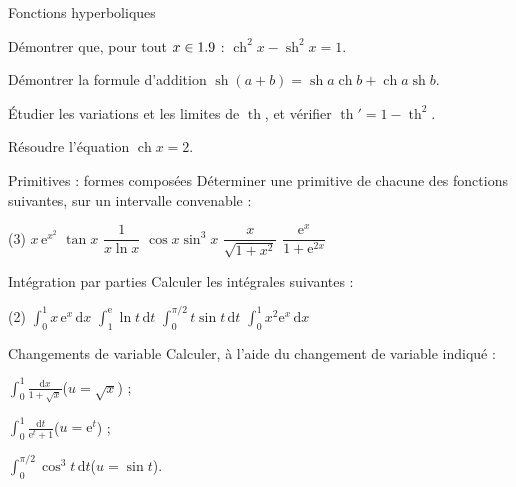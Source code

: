 \begin{exercice}[2]{Fonctions hyperboliques}
\begin{questions}
  \item Démontrer que, pour tout $x\in1.9$ :
    $\operatorname{ch}^{2}x-\operatorname{sh}^{2}x=1$.
  \item Démontrer la formule d'addition
    $\operatorname{sh}(a+b)=\operatorname{sh}a\operatorname{ch}b+\operatorname{ch}a\operatorname{sh}b$.
  \item Étudier les variations et les limites de $\operatorname{th}$, et
    vérifier $\operatorname{th}'=1-\operatorname{th}^{2}$.
  \item Résoudre l'équation $\operatorname{ch}x=2$.
\end{questions}
\end{exercice}

\begin{exercice}[2]{Primitives : formes composées}
Déterminer une primitive de chacune des fonctions suivantes, sur un
intervalle convenable :
\begin{tasks}(3)
  \task $x\,\mathrm{e}^{x^{2}}$
  \task $\tan x$
  \task $\dfrac{1}{x\ln x}$
  \task $\cos x\sin^{3}x$
  \task $\dfrac{x}{\sqrt{1+x^{2}}}$
  \task $\dfrac{\mathrm{e}^{x}}{1+\mathrm{e}^{2x}}$
\end{tasks}
\end{exercice}

\begin{exercice}[2]{Intégration par parties}
Calculer les intégrales suivantes :
\begin{tasks}(2)
  \task $\displaystyle\int_{0}^{1}x\,\mathrm{e}^{x}\,\mathrm{d}x$
  \task $\displaystyle\int_{1}^{\mathrm{e}}\ln t\,\mathrm{d}t$
  \task $\displaystyle\int_{0}^{\pi/2}t\sin t\,\mathrm{d}t$
  \task $\displaystyle\int_{0}^{1}x^{2}\mathrm{e}^{x}\,\mathrm{d}x$
\end{tasks}
\end{exercice}

\begin{exercice}[2]{Changements de variable}
Calculer, à l'aide du changement de variable indiqué :
\begin{questions}
  \item $\displaystyle\int_{0}^{1}\frac{\mathrm{d}x}{1+\sqrt{x}}$\quad($u=\sqrt{x}$) ;
  \item $\displaystyle\int_{0}^{1}\frac{\mathrm{d}t}{\mathrm{e}^{t}+1}$\quad($u=\mathrm{e}^{t}$) ;
  \item $\displaystyle\int_{0}^{\pi/2}\cos^{3}t\,\mathrm{d}t$\quad($u=\sin t$).
\end{questions}
\end{exercice}

